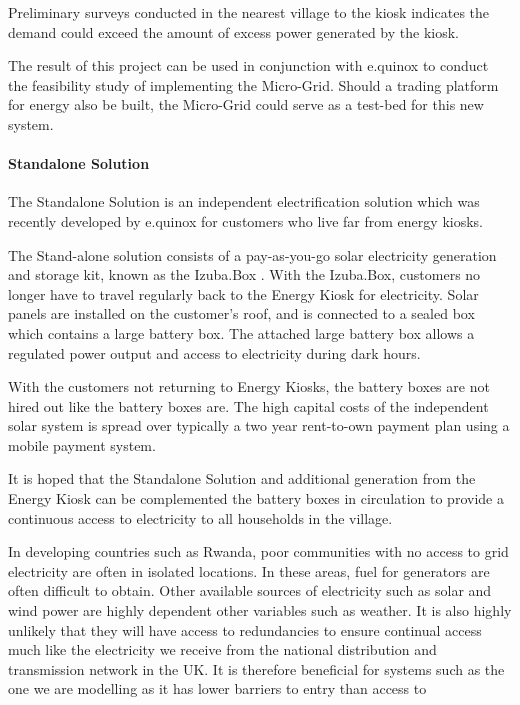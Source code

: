 \documentclass{article}
\begin{document}
Preliminary surveys conducted in the nearest village to the kiosk indicates the demand could exceed the amount of excess power generated by the kiosk. 

The result of this project can be used in conjunction with e.quinox to conduct the feasibility study of implementing the Micro-Grid. Should a trading platform for energy also be built, the Micro-Grid could serve as a test-bed for this new system.

\paragraph{Standalone Solution}
The Standalone Solution is an independent electrification solution which was recently developed by e.quinox for customers who live far from energy kiosks.

The Stand-alone solution consists of a pay-as-you-go solar electricity generation and storage kit, known as the Izuba.Box \cite{e.quinox-Standalone-web:2012}.  With the Izuba.Box, customers no longer have to travel regularly back to the Energy Kiosk for electricity. Solar panels are installed on the customer’s roof, and is connected to a sealed box which contains a large battery box. The attached large battery box allows a regulated power output and access to electricity during dark hours. 

With the customers not returning to Energy Kiosks, the battery boxes are not hired out like the battery boxes are. The high capital costs of the independent solar system is spread over typically a two year rent-to-own payment plan using a mobile payment system.

It is hoped that the Standalone Solution and additional generation from the Energy Kiosk can be complemented the battery boxes in circulation to provide a continuous access to electricity to all households in the village.

In developing countries such as Rwanda, poor communities with no access to grid electricity are often in isolated locations. In these areas, fuel for generators are often difficult to obtain. Other available sources of electricity such as solar and wind power are highly dependent other variables such as weather. It is also highly unlikely that they will have access to redundancies to ensure continual access much like the electricity we receive from the national distribution and transmission network in the UK. It is therefore beneficial for systems such as the one we are modelling as it has lower barriers to entry than access to 
\end{document}
